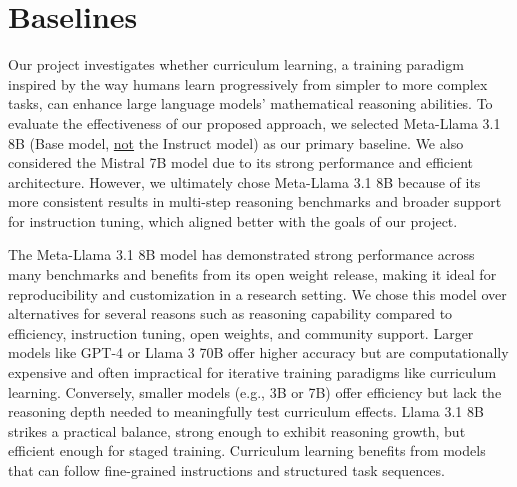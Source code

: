 \section{Baselines}
Our project investigates whether curriculum learning, a training paradigm inspired by the way humans learn progressively from simpler to more complex tasks, can enhance large language models' mathematical reasoning abilities.
To evaluate the effectiveness of our proposed approach, we selected Meta-Llama 3.1 8B (Base model, \underline{not} the Instruct model) \cite{touvron2023llamaopenefficientfoundation} as our primary baseline. We also considered the Mistral 7B model due to its strong performance and efficient architecture. However, we ultimately chose Meta-Llama 3.1 8B because of its more consistent results in multi-step reasoning benchmarks and broader support for instruction tuning, which aligned better with the goals of our project.


The Meta-Llama 3.1 8B model has demonstrated strong performance across many benchmarks and benefits from its open weight release, making it ideal for reproducibility and customization in a research setting. We chose this model over alternatives for several reasons such as reasoning capability compared to efficiency, instruction tuning, open weights, and community support. Larger models like GPT-4 or Llama 3 70B offer higher accuracy but are computationally expensive and often impractical for iterative training paradigms like curriculum learning. Conversely, smaller models (e.g., 3B or 7B) offer efficiency but lack the reasoning depth needed to meaningfully test curriculum effects. Llama 3.1 8B strikes a practical balance, strong enough to exhibit reasoning growth, but efficient enough for staged training. Curriculum learning benefits from models that can follow fine-grained instructions and structured task sequences. %

